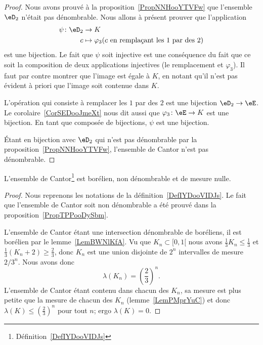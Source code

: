 \begin{proof}

	Nous avons prouvé à la proposition~\ref{PropNNHooYTVFw} que l'ensemble \( \eD_2\) n'était pas dénombrable. Nous allons à présent prouver que l'application
	\begin{equation}
		\begin{aligned}
			\psi\colon \eD_2 & \to K                                                                   \\
			c                & \mapsto \varphi_3(   c\text{ en remplaçant les } 1\text{ par des } 2  )
		\end{aligned}
	\end{equation}
	est une bijection. Le fait que \( \psi\) soit injective est une conséquence du fait que ce soit la composition de deux applications injectives (le remplacement et \( \varphi_3\)). Il faut par contre montrer que l'image est égale à \( K\), en notant qu'il n'est pas évident à priori que l'image soit contenue dans \( K\).

	L'opération qui consiste à remplacer les \( 1\) par des \( 2\) est une bijection \( \eD_2\to \eE\). Le corolaire~\ref{CorSEDooJmeXt} nous dit aussi que \( \varphi_3\colon \eE\to K\) est une bijection. En tant que composée de bijections, \( \psi\) est une bijection.

	Étant en bijection avec \( \eD_2\) qui n'est pas dénombrable par la proposition~\ref{PropNNHooYTVFw}, l'ensemble de Cantor n'est pas dénombrable.
\end{proof}

\begin{proposition}    \label{PropBEWooXZdKN}
	L'ensemble de Cantor\footnote{Définition~\ref{DefIYDooVIDJs}} est borélien, non dénombrable et de mesure nulle.
\end{proposition}

\begin{proof}
	Nous reprenons les notations de la définition~\ref{DefIYDooVIDJs}. Le fait que l'ensemble de Cantor soit non dénombrable a été prouvé dans la proposition~\ref{PropTPPooDySbm}.

	L'ensemble de Cantor étant une intersection dénombrable de boréliens, il est borélien par le lemme~\ref{LemBWNlKfA}. Vu que \( K_n\subset\mathopen[ 0 , 1 [\) nous avons \( \frac{1}{ 3 }K_n\leq \frac{1}{ 3 }\) et \( \frac{1}{ 3 }(K_n+2)\geq \frac{ 2 }{ 3 }\), donc \( K_n\) est une union disjointe de \( 2^n\) intervalles de mesure \( 2/3^n\). Nous avons donc
	\begin{equation}
		\lambda(K_n)=\left( \frac{ 2 }{ 3 } \right)^n.
	\end{equation}
	L'ensemble de Cantor étant contenu dans chacun des \( K_n\), sa mesure est plus petite que la mesure de chacun des \( K_n\) (lemme~\ref{LemPMprYuC}) et donc \( \lambda(K)\leq \left( \frac{ 2 }{ 3 } \right)^n\) pour tout \( n\); ergo \( \lambda(K)=0\).
\end{proof}

